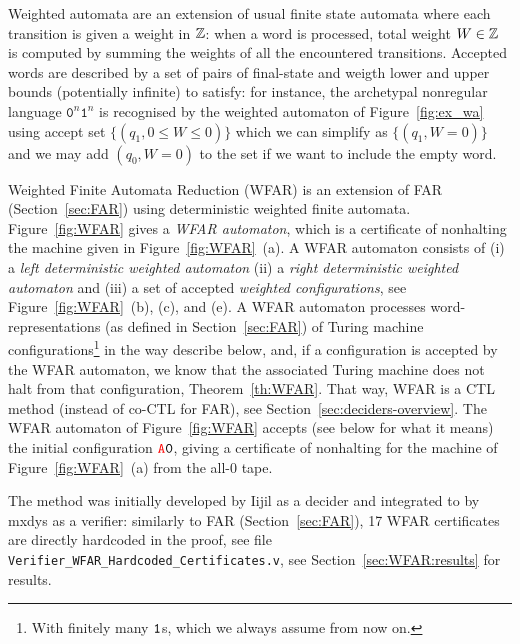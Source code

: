 Weighted automata are an extension of usual finite state automata where each transition is given a weight in $\mathbb{Z}$: when a word is processed, total weight $W \in \mathbb{Z}$ is computed by summing the weights of all the encountered transitions. Accepted words are described by a set of pairs of final-state and weigth lower and upper bounds (potentially infinite) to satisfy: for instance, the archetypal nonregular language $\texttt{0}^n \texttt{1}^n$ is recognised by the weighted automaton of Figure~\ref{fig:ex_wa} using accept set $\{(q_1,0 \leq W \leq 0)\}$ which we can simplify as $\{(q_1,W=0)\}$ and we may add $(q_0,W=0)$ to the set if we want to include the empty word.

Weighted Finite Automata Reduction (WFAR) is an extension of FAR (Section~\ref{sec:FAR}) using deterministic weighted finite automata. Figure~\ref{fig:WFAR} gives a \textit{WFAR automaton}, which is a certificate of nonhalting the machine given in Figure~\ref{fig:WFAR}~(a). A WFAR automaton consists of (i) a \textit{left deterministic weighted automaton} (ii) a \textit{right deterministic weighted automaton} and (iii) a set of accepted \textit{weighted configurations}, see Figure~\ref{fig:WFAR}~(b), (c), and (e).
A WFAR automaton processes word-representations (as defined in Section~\ref{sec:FAR}) of Turing machine configurations\footnote{With finitely many $\texttt{1}$s, which we always assume from now on.} in the way describe below, and, if a configuration is accepted by the WFAR automaton, we know that the associated Turing machine does not halt from that configuration, Theorem~\ref{th:WFAR}. That way, WFAR is a CTL method (instead of co-CTL for FAR), see Section~\ref{sec:deciders-overview}. The WFAR automaton of Figure~\ref{fig:WFAR} accepts (see below for what it means) the initial configuration $\texttt{\stateA}\szero$, giving a certificate of nonhalting for the machine of Figure~\ref{fig:WFAR}~(a) from the all-0 tape.

The method was initially developed by Iijil as a decider \cite{iijil1_2025_14914502} and integrated to \CoqBB by mxdys as a verifier: similarly to FAR (Section~\ref{sec:FAR}), 17 WFAR certificates are directly hardcoded in the \Coq proof, see file \texttt{Verifier\_WFAR\_Hardcoded\_Certificates.v}, see Section~\ref{sec:WFAR:results} for results.

